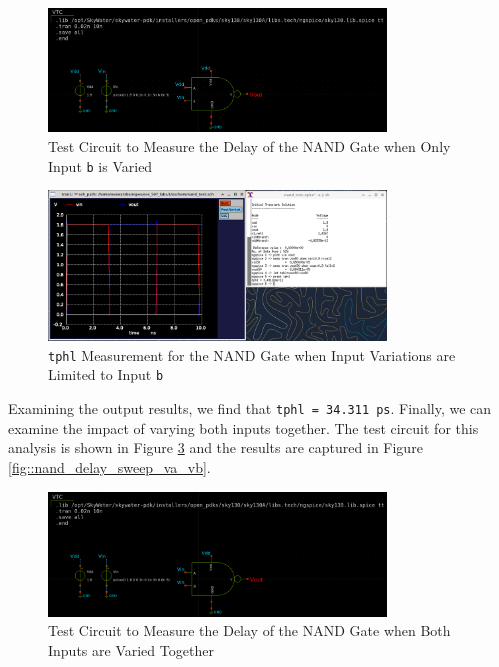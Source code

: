 \documentclass[fleqn]{article}
\begin{document}
	\begin{figure}[H]
		\centerline{\includegraphics[width=0.8\textwidth]{nand_delay_test_sweep_vb.png}}
		\caption{Test Circuit to Measure the Delay of the NAND Gate when Only Input \texttt{b} is Varied}
		\label{fig::nand_delay_test_sweep_vb}
	\end{figure}
	
	\begin{figure}[H]
		\centerline{\includegraphics[width=0.8\textwidth]{nand_delay_sweep_vb.png}}
		\caption{\texttt{tphl} Measurement for the NAND Gate when Input Variations are Limited to Input \texttt{b}}
		\label{fig::nand_delay_sweep_vb}
	\end{figure}
	
	Examining the output results, we find that \texttt{tphl = 34.311 ps}. Finally, we can examine the impact of varying both inputs together. The test circuit for this analysis is shown in Figure  \ref{fig::nand_delay_test_sweep_va_vb} and the results are captured in Figure  \ref{fig::nand_delay_sweep_va_vb}.
	
	\begin{figure}[H]
		\centerline{\includegraphics[width=0.8\textwidth]{nand_delay_test_sweep_va_vb.png}}
		\caption{Test Circuit to Measure the Delay of the NAND Gate when Both Inputs are Varied Together}
		\label{fig::nand_delay_test_sweep_va_vb}
	\end{figure}
	
\end{document}
